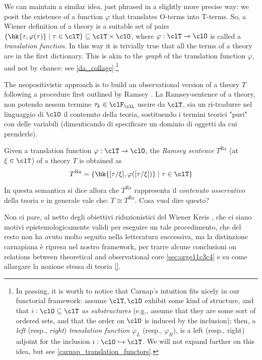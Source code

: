 We can maintain a similar idea, just phrased in a slightly more precise way: we posit the existence of a function $\varphi$ that translates O-terms into T-terms. So, a Wiener definition of a theory is a suitable set of pairs $\{\bk{\tau,\varphi(\tau)} \mid \tau\in\clT\}\subseteq \clT\times\clO$, where $\varphi: \clT \to \clO$ is called a \emph{translation function}. In this way it is trivially true that all the terms of a theory are in the first dictionary. This is akin to the \emph{graph} of the translation function $\varphi$, and not by chance: see \autoref{da_collage}.\footnote{In passing, it is worth to notice that Carnap's intuition fits nicely in our functorial framework: assume $\clT, \clO$ exhibit some kind of structure, and that $i : \clO\subseteq\clT$ \emph{as substructures} (e.g., assume that they are some sort of ordered sets, and that the order on $\clO$ is induced by the inclusion); then, a \emph{left} (resp., \emph{right}) \emph{translation function} $\varphi_L$ (resp., $\varphi_R$), is a left (resp., right) adjoint for the inclusion $i : \clO\hookrightarrow \clT$. We will not expand further on this idea, but see \autoref{carnap_translation_functors}.}

The neopositivistic approach is to build an observational version of a theory $T$ following a procedure first outlined by Ramsey \cite{?}. La Ramsey-sentence of a theory, non potendo nessun termine $\tau_k \in \clF_\clL$ uscire da $\clT$, sia un ri-tradurre nel linguaggio di $\clO$ il contenuto della teoria, sostituendo i termini teorici "puri" con delle variabili (dimenticando di specificare un dominio di oggetti da cui prenderle).
\begin{definition} 
	Given a translation function $\varphi: \clT \to \clO$, the \emph{Ramsey sentence} $T^\text{Ra}$ (at $\xi\in\clT$) of a theory $T$ is obtained as  
	\[ 
		T^\text{Ra} = \{\bk{[\tau/\xi], \varphi([\tau/\xi])} \mid \tau\in\clT\} 
	\]
\end{definition}
In questa semantica si dice allora che $T^\text{Ra}$ rappresenta il \emph{contenuto osservativo} della teoria e in generale vale che: $T \cong T^\text{Ra}$. 
{\color{red} Cosa vuol dire questo?}

\medskip
Non ci pare, al netto degli obiettivi riduzionistici del Wiener Kreis \cite{}, che ci siano motivi epistemologicamente validi per eseguire un tale procedimento, che del resto non ha avuto molto seguito nella letteratura successiva, ma la distinzione carnapiana è ripresa nel nostro framework, per trarre alcune conclusioni on relations between theoretical and observational core \autoref{sec:orge11c3c4} e su come allargare la nozione stessa di teoria \autoref{}.

